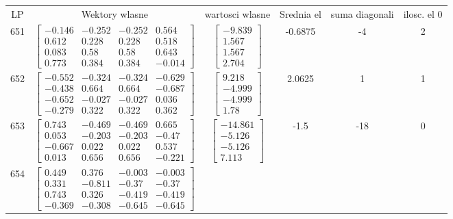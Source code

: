 \documentclass[a4paper,12pt]{article}
\begin{document}
\bgroup {} \vspace{0.2in} \begin{tabular}{c c c c c c}
LP &Wektory wlasne & wartosci wlasne & Srednia el & suma diagonali & ilosc. el 0\\
651
&
$\begin{bmatrix} -0.146 & -0.252 & -0.252 & 0.564 \\ 0.612 & 0.228 & 0.228 & 0.518 \\ 0.083 & 0.58 & 0.58 & 0.643 \\ 0.773 & 0.384 & 0.384 & -0.014 \end{bmatrix}$
&
$\begin{bmatrix} -9.839 \\ 1.567 \\ 1.567 \\ 2.704 \end{bmatrix}$
&
-0.6875
&
-4
&
2
\\
652
&
$\begin{bmatrix} -0.552 & -0.324 & -0.324 & -0.629 \\ -0.438 & 0.664 & 0.664 & -0.687 \\ -0.652 & -0.027 & -0.027 & 0.036 \\ -0.279 & 0.322 & 0.322 & 0.362 \end{bmatrix}$
&
$\begin{bmatrix} 9.218 \\ -4.999 \\ -4.999 \\ 1.78 \end{bmatrix}$
&
2.0625
&
1
&
1
\\
653
&
$\begin{bmatrix} 0.743 & -0.469 & -0.469 & 0.665 \\ 0.053 & -0.203 & -0.203 & -0.47 \\ -0.667 & 0.022 & 0.022 & 0.537 \\ 0.013 & 0.656 & 0.656 & -0.221 \end{bmatrix}$
&
$\begin{bmatrix} -14.861 \\ -5.126 \\ -5.126 \\ 7.113 \end{bmatrix}$
&
-1.5
&
-18
&
0
\\
654
&
$\begin{bmatrix} 0.449 & 0.376 & -0.003 & -0.003 \\ 0.331 & -0.811 & -0.37 & -0.37 \\ 0.743 & 0.326 & -0.419 & -0.419 \\ -0.369 & -0.308 & -0.645 & -0.645 \end{bmatrix}$

\end{tabular}
\end{document}
